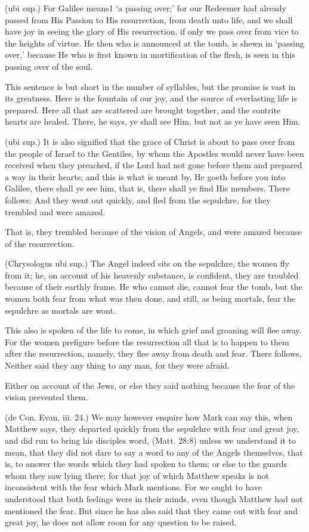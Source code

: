  (ubi sup.) For Galilee means1 ‘a passing over;’ for our Redeemer had already passed from His Passion to His resurrection, from death unto life, and we shall have joy in seeing the glory of His resurrection, if only we pass over from vice to the heights of virtue. He then who is announced at the tomb, is shewn in ‘passing over,’ because He who is first known in mortification of the flesh, is seen in this passing over of the soul.

 This sentence is but short in the number of syllables, but the promise is vast in its greatness. Here is the fountain of our joy, and the source of everlasting life is prepared. Here all that are scattered are brought together, and the contrite hearts are healed. There, he says, ye shall see Him, but not as ye have seen Him.

 (ubi sup.) It is also signified that the grace of Christ is about to pass over from the people of Israel to the Gentiles, by whom the Apostles would never have been received when they preached, if the Lord had not gone before them and prepared a way in their hearts; and this is what is meant by, He goeth before you into Galilee, there shall ye see him, that is, there shall ye find His members. There follows: And they went out quickly, and fled from the sepulchre, for they trembled and were amazed.

 That is, they trembled because of the vision of Angels, and were amazed because of the resurrection.

 (Chrysologus ubi sup.) The Angel indeed sits on the sepulchre, the women fly from it; he, on account of his heavenly substance, is confident, they are troubled because of their earthly frame. He who cannot die, cannot fear the tomb, but the women both fear from what was then done, and still, as being mortals, fear the sepulchre as mortals are wont.

 This also is spoken of the life to come, in which grief and groaning will flee away. For the women prefigure before the resurrection all that is to happen to them after the resurrection, namely, they flee away from death and fear. There follows, Neither said they any thing to any man, for they were afraid.

 Either on account of the Jews, or else they said nothing because the fear of the vision prevented them.

 (de Con. Evan. iii. 24.) We may however enquire how Mark can say this, when Matthew says, they departed quickly from the sepulchre with fear and great joy, and did run to bring his disciples word, (Matt. 28:8) unless we understand it to mean, that they did not dare to say a word to any of the Angels themselves, that is, to answer the words which they had spoken to them; or else to the guards whom they saw lying there; for that joy of which Matthew speaks is not inconsistent with the fear which Mark mentions. For we ought to have understood that both feelings were in their minds, even though Matthew had not mentioned the fear. But since he has also said that they came out with fear and great joy, he does not allow room for any question to be raised.


